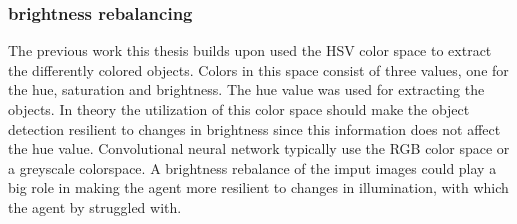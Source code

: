 
\subsubsection{brightness rebalancing}

The previous work this thesis builds upon used the HSV color space to extract the differently colored objects. Colors in this space consist of three values, one for the hue, saturation and brightness. The hue value was used for extracting the objects. In theory the utilization of this color space should make the object detection resilient to changes in brightness since this information does not affect the hue value.
Convolutional neural network typically use the RGB color space or a greyscale colorspace. A brightness rebalance of the imput images could play a big role in making the agent more resilient to changes in illumination, with which the agent by \autocite{maximilian} struggled with.





